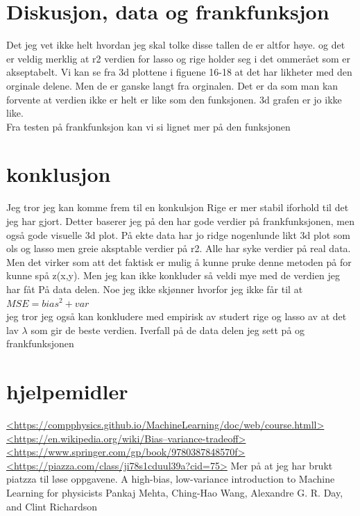 \documentclass[norsk,a4paper,12pt]{article}
\begin{document}
\section*{Diskusjon, data og frankfunksjon}
Det jeg vet ikke helt hvordan jeg skal tolke disse tallen de er altfor høye. og det er veldig merklig at r2 verdien for lasso og rige holder seg i det ommerået som er akseptabelt. Vi kan se fra 3d plottene i figuene 16-18 at det har likheter med den orginale delene. Men de er ganske langt fra orginalen. Det er da som man kan forvente at verdien ikke er helt er like som den funksjonen. 3d grafen er jo ikke like.
\\
Fra testen på frankfunksjon kan vi si lignet mer på den funksjonen
\section*{konklusjon}
Jeg tror jeg kan komme frem til en konkulsjon Rige er mer stabil iforhold til det jeg har gjort. Detter baserer jeg på den har gode verdier på frankfunksjonen, men også gode visuelle 3d plot. På ekte data har jo ridge nogenlunde likt 3d plot som ols og lasso men greie aksptable verdier på r2. Alle har syke verdier på real data. Men det virker som att det faktisk er mulig å kunne pruke denne metoden på for kunne spå z(x,y). Men jeg kan ikke konkluder så veldi mye med de verdien jeg har fåt På data delen. Noe jeg ikke skjønner hvorfor jeg ikke får til at $MSE=bias^{2} + var$\\
jeg tror jeg også kan konkludere med empirisk av studert rige og lasso av at det lav $\lambda $ som gir de beste verdien. Iverfall på de data delen jeg sett på og frankfunksjonen

\section*{hjelpemidler}
\url{<https://compphysics.github.io/MachineLearning/doc/web/course.htmll>}
\\

\url{<https://en.wikipedia.org/wiki/Bias–variance-tradeoff>}
\\
\url{<https://www.springer.com/gp/book/9780387848570f>}
\\
\url{<https://piazza.com/class/ji78s1cduul39a?cid=75>}
Mer på at jeg har brukt piatzza til løse oppgavene.
A high-bias, low-variance introduction to Machine Learning for physicists
Pankaj Mehta, Ching-Hao Wang, Alexandre G. R. Day, and Clint Richardson
\end{document}
